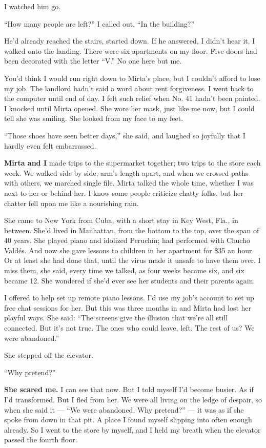 I watched him go.

``How many people are left?'' I called out. ``In the building?''

He'd already reached the stairs, started down. If he answered, I didn't
hear it. I walked onto the landing. There were six apartments on my
floor. Five doors had been decorated with the letter ``V.'' No one here
but me.

You'd think I would run right down to Mirta's place, but I couldn't
afford to lose my job. The landlord hadn't said a word about rent
forgiveness. I went back to the computer until end of day. I felt such
relief when No. 41 hadn't been painted. I knocked until Mirta opened.
She wore her mask, just like me now, but I could tell she was smiling.
She looked from my face to my feet.

``Those shoes have seen better days,'' she said, and laughed so joyfully
that I hardly even felt embarrassed.

\textbf{Mirta and I} made trips to the supermarket together; two trips
to the store each week. We walked side by side, arm's length apart, and
when we crossed paths with others, we marched single file. Mirta talked
the whole time, whether I was next to her or behind her. I know some
people criticize chatty folks, but her chatter fell upon me like a
nourishing rain.

She came to New York from Cuba, with a short stay in Key West, Fla., in
between. She'd lived in Manhattan, from the bottom to the top, over the
span of 40 years. She played piano and idolized Peruchín; had performed
with Chucho Valdés. And now she gave lessons to children in her
apartment for \$35 an hour. Or at least she had done that, until the
virus made it unsafe to have them over. I miss them, she said, every
time we talked, as four weeks became six, and six became 12. She
wondered if she'd ever see her students and their parents again.

I offered to help set up remote piano lessons. I'd use my job's account
to set up free chat sessions for her. But this was three months in and
Mirta had lost her playful ways. She said: ``The screens give the
illusion that we're all still connected. But it's not true. The ones who
could leave, left. The rest of us? We were abandoned.''

She stepped off the elevator.

``Why pretend?''

\textbf{She scared me.} I can see that now. But I told myself I'd become
busier. As if I'd transformed. But I fled from her. We were all living
on the ledge of despair, so when she said it --- ``We were abandoned.
Why pretend?'' --- it was as if she spoke from down in that pit. A place
I found myself slipping into often enough already. So I went to the
store by myself, and I held my breath when the elevator passed the
fourth floor.

